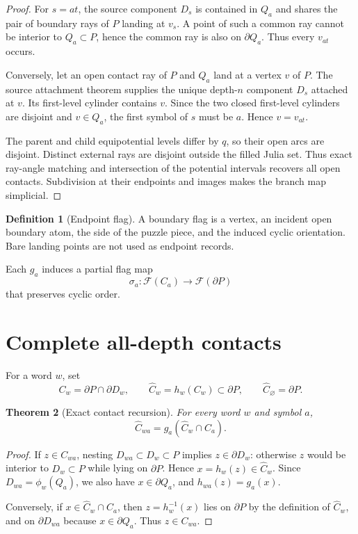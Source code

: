 \documentclass[11pt]{article}
\newtheorem{theorem}{Theorem}[section]
\theoremstyle{definition}
\newtheorem{definition}[theorem]{Definition}
\theoremstyle{remark}
\newcommand{\F}{\mathscr F}
\begin{document}
\begin{proof}
For $s=at$, the source component $D_s$ is contained in $Q_a$ and shares the
pair of boundary rays of $P$ landing at $v_s$.  A point of such a common ray
cannot be interior to $Q_a\subset P$, hence the common ray is also on
$\partial Q_a$.  Thus every $v_{at}$ occurs.

Conversely, let an open contact ray of $P$ and $Q_a$ land at a vertex $v$ of
$P$.  The source attachment theorem supplies the unique depth-$n$ component
$D_s$ attached at $v$.  Its first-level cylinder contains $v$.  Since the two
closed first-level cylinders are disjoint and $v\in Q_a$, the first symbol of
$s$ must be $a$.  Hence $v=v_{at}$.

The parent and child equipotential levels differ by $q$, so their open arcs are
disjoint.  Distinct external rays are disjoint outside the filled Julia set.
Thus exact ray-angle matching and intersection of the potential intervals
recovers all open contacts.  Subdivision at their endpoints and images makes
the branch map simplicial. 
\end{proof}

\begin{definition}[Endpoint flag]
A boundary flag is a vertex, an incident open boundary atom, the side of the
puzzle piece, and the induced cyclic orientation.  Bare landing points are not
used as endpoint records.
\end{definition}

Each $g_a$ induces a partial flag map
\[
 \sigma_a:\F(C_a)\longrightarrow\F(\partial P)
\]
that preserves cyclic order.

\section{Complete all-depth contacts}
For a word $w$, set
\[
 C_w=\partial P\cap\partial D_w,
 \qquad
 \widehat C_w=h_w(C_w)\subset\partial P,
 \qquad
 \widehat C_{\varnothing}=\partial P.
\]

\begin{theorem}[Exact contact recursion]
For every word $w$ and symbol $a$,
\[
 \boxed{\widehat C_{wa}=g_a(\widehat C_w\cap C_a).}
\]
\end{theorem}

\begin{proof}
If $z\in C_{wa}$, nesting $D_{wa}\subset D_w\subset P$ implies
$z\in\partial D_w$: otherwise $z$ would be interior to $D_w\subset P$ while
lying on $\partial P$.  Hence $x=h_w(z)\in\widehat C_w$.  Since
$D_{wa}=\phi_w(Q_a)$, we also have $x\in\partial Q_a$, and
$h_{wa}(z)=g_a(x)$.

Conversely, if $x\in\widehat C_w\cap C_a$, then
$z=h_w^{-1}(x)$ lies on $\partial P$ by the definition of $\widehat C_w$, and
on $\partial D_{wa}$ because $x\in\partial Q_a$.  Thus $z\in C_{wa}$.
\end{proof}
\end{document}
